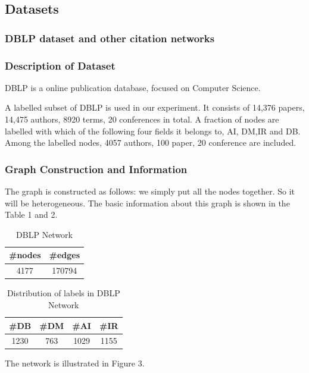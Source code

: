 \subsection{Datasets}
\subsubsection{DBLP dataset and other citation networks}
\subsubsection*{Description of Dataset}
DBLP is a online publication database, focused on Computer Science. 

A labelled subset of DBLP is used in our experiment. It consists of 14,376 papers, 14,475 authors, 8920 terms, 20 conferences in total. A fraction of nodes are labelled with which of the following four fields it belongs to, AI, DM,IR and DB. Among the labelled nodes, 4057 authors, 100 paper, 20 conference are included.
\subsubsection*{Graph Construction and Information}
The graph is constructed as follows: we simply put all the nodes together. So it will be heterogeneous. The basic information about this graph is shown in the Table 1 and 2.

\begin{table}[!ht]
\centering
\begin{tabular}{cc}
\toprule
\textbf{\#nodes} & \textbf{\#edges}\\
\midrule
4177 & 170794\\
\bottomrule
\end{tabular}
\caption{DBLP Network}
\end{table}

\begin{table}[!ht]
\centering
\begin{tabular}{cccc}
\toprule
\textbf{\#DB} & \textbf{\#DM} & \textbf{\#AI} & \textbf{\#IR}\\
\midrule
1230 & 763 & 1029 & 1155\\
\bottomrule
\end{tabular}
\caption{Distribution of labels in DBLP Network}
\end{table}

The network is illustrated in Figure 3.

